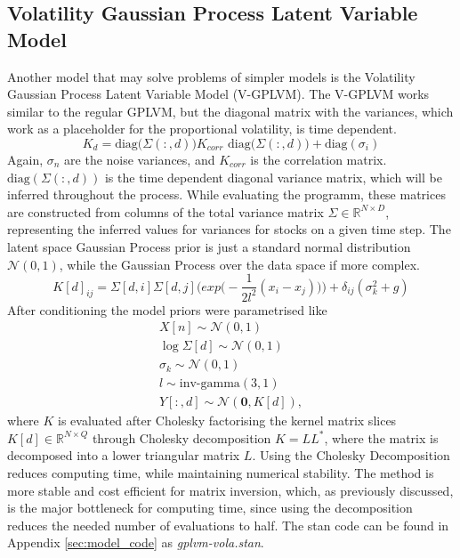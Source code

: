 \subsection{Volatility Gaussian Process Latent Variable Model}
\label{sec:v_gplvm}
Another model that may solve problems of simpler models is the Volatility Gaussian Process Latent Variable Model (V-GPLVM). The V-GPLVM works similar to the regular GPLVM, but the diagonal matrix with the variances, which work as a placeholder for the proportional volatility, is time dependent. 
\begin{equation}%
	K_d = \text{diag}\Big(\Sigma(:,d)\Big) K_{corr} \text{ diag}\Big(\Sigma(:,d)\Big) + \text{diag}(\sigma_i)
\label{eq: V-GPLVM matrix form}
\end{equation}
Again, $\sigma_n$ are the noise variances, and $K_{corr}$ is the correlation matrix. $\text{diag}(\Sigma(:,d))$ is the time dependent diagonal variance matrix, which will be inferred throughout the process. While evaluating the programm, these matrices are constructed from columns of the total variance matrix $\Sigma \in \mathbb{R}^{N\times D}$, representing the inferred values for variances for stocks on a given time step. The latent space Gaussian Process prior is just a standard normal distribution $\mathcal{N}(0,1)$, while the Gaussian Process over the data space if more complex. 
\begin{equation}%
	K[d]_{ij} = \Sigma[d,i] \Sigma[d,j] \Bigg( exp\Big(-\frac{1}{2l^2}(x_i-x_j)\Big)\Bigg)+ \delta_{ij}(\sigma_k^2 + g)
\label{eq: V-GPLVM K_y Element}
\end{equation}
After conditioning the model priors were parametrised like
\begin{subequations}
	\label{eq:V-GPLVM conditioning}
	\begin{align}
	X[n] \sim \mathcal{N}(0,1)                  \nonumber \\
	\log\Sigma[d] \sim \mathcal{N}(0,1)         \nonumber \\
	\sigma_k \sim \mathcal{N}(0,1)              \nonumber \\
	l \sim \text{inv-gamma}(3,1)                \nonumber \\
	Y[:,d] \sim \mathcal{N}(\bm{0}, K[d]), \nonumber
	\end{align}
\end{subequations}
where $K$ is evaluated after Cholesky factorising the kernel matrix slices $K[d] \in \mathbb{R}^{N\times Q}$ through Cholesky decomposition $K = LL^*$, where the matrix is decomposed into a lower triangular matrix $L$. Using the Cholesky Decomposition reduces computing time, while maintaining numerical stability. The method is more stable and cost efficient for matrix inversion, which, as previously discussed, is the major bottleneck for computing time, since using the decomposition reduces the needed number of evaluations to half. The stan code can be found in Appendix \ref{sec:model_code} as \textit{gplvm-vola.stan}.